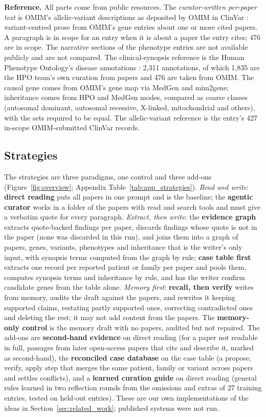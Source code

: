 \documentclass{article} %
\begin{document}
\textbf{Reference.} All parts come from public resources. The \emph{curator-written per-paper text} is OMIM's allelic-variant descriptions as deposited by OMIM in ClinVar \citep{landrum2025clinvar}: variant-centred prose from OMIM's gene entries about one or more cited papers. A paragraph is in scope for an entry when it is about a paper the entry cites; 476 are in scope. The narrative sections of the phenotype entries are not available publicly and are not compared. The clinical-synopsis reference is the Human Phenotype Ontology's disease annotations \citep{gargano2024human}: 2,311 annotations, of which 1,835 are the HPO team's own curation from papers and 476 are taken from OMIM. The causal gene comes from OMIM's gene map via MedGen \citep{Louden2020MedgenNcbis} and mim2gene; inheritance comes from HPO and MedGen modes, compared as coarse classes (autosomal dominant, autosomal recessive, X-linked, mitochondrial and others), with the sets required to be equal. The allelic-variant reference is the entry's 427 in-scope OMIM-submitted ClinVar records.

\subsection{Strategies}
\label{sec:strategies}
The strategies are three paradigms, one control and three add-ons (Figure~\ref{fig:overview}; Appendix Table~\ref{tab:app_strategies}). \emph{Read and write}: \textbf{direct reading} puts all papers in one prompt and is the baseline; the \textbf{agentic curator} works in a folder of the papers with read and search tools and must give a verbatim quote for every paragraph. \emph{Extract, then write}: the \textbf{evidence graph} extracts quote-backed findings per paper, discards findings whose quote is not in the paper (none was discarded in this run), and joins them into a graph of papers, genes, variants, phenotypes and inheritance that is the writer's only input, with synopsis terms computed from the graph by rule; \textbf{case table first} extracts one record per reported patient or family per paper and pools them, computes synopsis terms and inheritance by rule, and has the writer confirm candidate genes from the table alone. \emph{Memory first}: \textbf{recall, then verify} writes from memory, audits the draft against the papers, and rewrites it keeping supported claims, restating partly supported ones, correcting contradicted ones and deleting the rest; it may not add content from the papers. The \textbf{memory-only control} is the memory draft with no papers, audited but not repaired. The add-ons are \textbf{second-hand evidence} on direct reading (for a paper not readable in full, passages from later open-access papers that cite and describe it, marked as second-hand), the \textbf{reconciled case database} on the case table (a propose, verify, apply step that merges the same patient, family or variant across papers and settles conflicts), and a \textbf{learned curation guide} on direct reading (general rules learned in two reflection rounds from the omissions and extras of 27 training entries, tested on held-out entries). These are our own implementations of the ideas in Section~\ref{sec:related_work}; published systems were not run.
\end{document}
